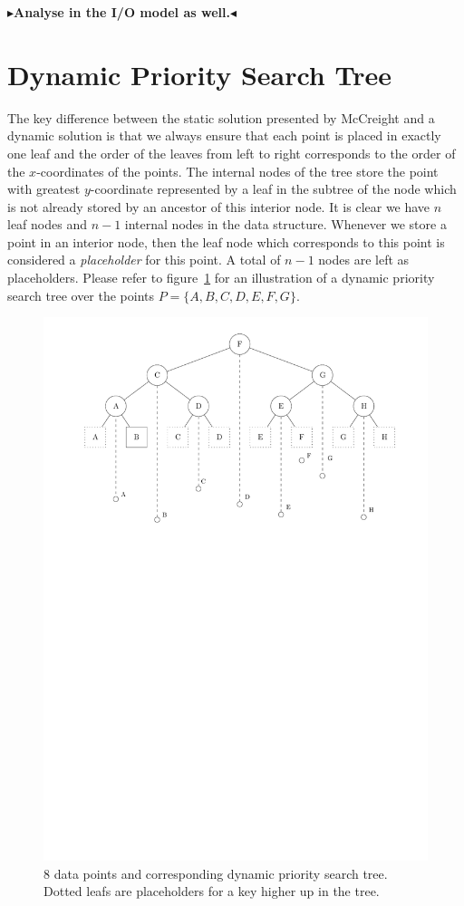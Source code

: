 \documentclass[twoside,11pt,openright]{report}
\newcommand{\todo}[1]{{\color[rgb]{.5,0,0}\textbf{$\blacktriangleright$#1$\blacktriangleleft$}}}
\begin{document}
\todo{Analyse in the I/O model as well.}

\section{Dynamic Priority Search Tree}
The key difference between the static solution presented by McCreight and a dynamic solution is that we always ensure that each point is placed in exactly one leaf and the order of the leaves from left to right corresponds to the order of the $x$-coordinates of the points. The internal nodes of the tree store the point with greatest $y$-coordinate represented by a leaf in the subtree of the node which is not already stored by an ancestor of this interior node. It is clear we have $n$ leaf nodes and $n-1$ internal nodes in the data structure.
Whenever we store a point in an interior node, then the leaf node which corresponds to this point is considered a \textit{placeholder} for this point. A total of $n - 1$ nodes are left as placeholders. Please refer to figure~\ref{fig:dynamic_pst} for an illustration of a dynamic priority search tree over the points $P = \{A, B, C, D, E, F, G \}$.

\begin{figure}[h]
	\centering
	\includegraphics[scale=0.68]{../figures/internal_pst_dynamic}
	\caption{8 data points and corresponding dynamic priority search tree. Dotted leafs are placeholders for a key higher up in the tree.}
	\label{fig:dynamic_pst}
\end{figure}
\end{document}
